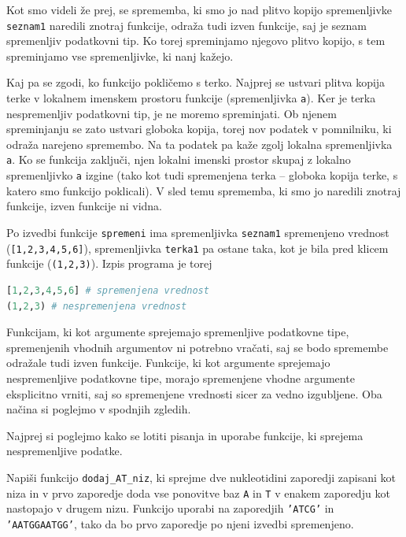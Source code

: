 \begin{resitev}
Kot smo videli že prej, se sprememba, ki smo jo nad plitvo kopijo spremenljivke \texttt{seznam1} naredili znotraj funkcije, odraža tudi izven funkcije, saj je seznam spremenljiv podatkovni tip. Ko torej spreminjamo njegovo plitvo kopijo, s tem spreminjamo vse spremenljivke, ki nanj kažejo. 

Kaj pa se zgodi, ko funkcijo pokličemo s terko. Najprej se ustvari plitva kopija terke v lokalnem imenskem prostoru funkcije (spremenljivka \texttt{a}). Ker je terka nespremenljiv podatkovni tip, je ne moremo spreminjati. Ob njenem spreminjanju se zato ustvari globoka kopija, torej nov podatek v pomnilniku, ki odraža narejeno spremembo. Na ta podatek pa kaže zgolj lokalna spremenljivka \texttt{a}. Ko se funkcija zaključi, njen lokalni imenski prostor skupaj z lokalno spremenljivko \texttt{a} izgine (tako kot tudi spremenjena terka -- globoka kopija terke, s katero smo funkcijo poklicali). V sled temu sprememba, ki smo jo naredili znotraj funkcije, izven funkcije ni vidna.

Po izvedbi funkcije \texttt{spremeni} ima spremenljivka \texttt{seznam1} spremenjeno vrednost (\texttt{[1,2,3,4,5,6]}), spremenljivka \texttt{terka1} pa ostane taka, kot je bila pred klicem funkcije (\texttt{(1,2,3)}). Izpis programa je torej
\begin{lstlisting}[language=Python]
[1,2,3,4,5,6] # spremenjena vrednost
(1,2,3) # nespremenjena vrednost
\end{lstlisting}

\end{resitev}

Funkcijam, ki kot argumente sprejemajo spremenljive podatkovne tipe, spremenjenih vhodnih argumentov ni potrebno vračati, saj se bodo spremembe odražale tudi izven funkcije. Funkcije, ki kot argumente sprejemajo nespremenljive podatkovne tipe, morajo spremenjene vhodne argumente eksplicitno vrniti, saj so spremenjene vrednosti sicer za vedno izgubljene. Oba načina si poglejmo v spodnjih zgledih.

Najprej si poglejmo kako se lotiti pisanja in uporabe funkcije, ki sprejema nespremenljive podatke.
\begin{zgled}
Napiši funkcijo \texttt{dodaj\_AT\_niz}, ki sprejme dve nukleotidini zaporedji zapisani kot niza in v prvo zaporedje doda vse ponovitve baz \texttt{A} in \texttt{T} v enakem zaporedju kot nastopajo v drugem nizu. Funkcijo uporabi na zaporedjih \texttt{'ATCG'} in \texttt{'AATGGAATGG'}, tako da bo prvo zaporedje po njeni izvedbi spremenjeno.
\end{zgled}

